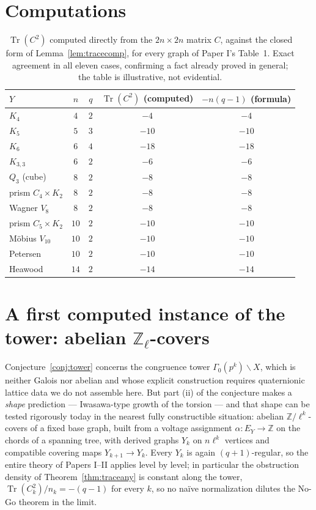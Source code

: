 \documentclass[11pt]{amsart}
\numberwithin{equation}{section}
\theoremstyle{definition}
\theoremstyle{remark}
\newcommand{\Z}{\mathbb{Z}}
\newcommand{\Tr}{\operatorname{Tr}}
\begin{document}
\section{Computations}\label{sec:computations}

\begin{table}[ht]
\centering\small
\renewcommand{\arraystretch}{1.15}
\begin{tabular}{lcccc}
\toprule
$Y$ & $n$ & $q$ & $\Tr(C^2)$ (computed) & $-n(q-1)$ (formula)\\
\midrule
$K_4$              & $4$  & $2$ & $-4$  & $-4$\\
$K_5$              & $5$  & $3$ & $-10$ & $-10$\\
$K_6$              & $6$  & $4$ & $-18$ & $-18$\\
$K_{3,3}$          & $6$  & $2$ & $-6$  & $-6$\\
$Q_3$ (cube)       & $8$  & $2$ & $-8$  & $-8$\\
prism $C_4\times K_2$&$8$ & $2$ & $-8$  & $-8$\\
Wagner $V_8$       & $8$  & $2$ & $-8$  & $-8$\\
prism $C_5\times K_2$&$10$& $2$ & $-10$ & $-10$\\
M\"obius $V_{10}$  & $10$ & $2$ & $-10$ & $-10$\\
Petersen           & $10$ & $2$ & $-10$ & $-10$\\
Heawood            & $14$ & $2$ & $-14$ & $-14$\\
\bottomrule
\end{tabular}
\medskip
\caption{$\Tr(C^2)$ computed directly from the $2n\times2n$ matrix $C$, against the
closed form of Lemma~\ref{lem:tracecomp}, for every graph of Paper I's Table~1. Exact
agreement in all eleven cases, confirming a fact already proved in general; the table is
illustrative, not evidential.}
\label{tab:trace}
\end{table}

\section{A first computed instance of the tower: abelian
\texorpdfstring{$\Z_\ell$}{Z-l}-covers}\label{sec:abtower}

Conjecture~\ref{conj:tower} concerns the congruence tower $\Gamma_0(p^k)\backslash X$,
which is neither Galois nor abelian and whose explicit construction requires quaternionic
lattice data we do not assemble here. But part (ii) of the conjecture makes a
\emph{shape} prediction --- Iwasawa-type growth of the torsion --- and that shape can be
tested rigorously today in the nearest fully constructible situation: abelian
$\Z/\ell^k$-covers of a fixed base graph, built from a voltage assignment
$\alpha\colon E_Y\to\Z$ on the chords of a spanning tree, with derived graphs
$Y_k$ on $n\ell^k$ vertices and compatible covering maps $Y_{k+1}\to Y_k$. Every $Y_k$ is
again $(q+1)$-regular, so the entire theory of Papers I--II applies level by level; in
particular the obstruction density of Theorem~\ref{thm:traceany} is constant along the
tower, $\Tr(C_k^2)/n_k=-(q-1)$ for every $k$, so no na\"ive normalization dilutes the
No-Go theorem in the limit.
\end{document}
